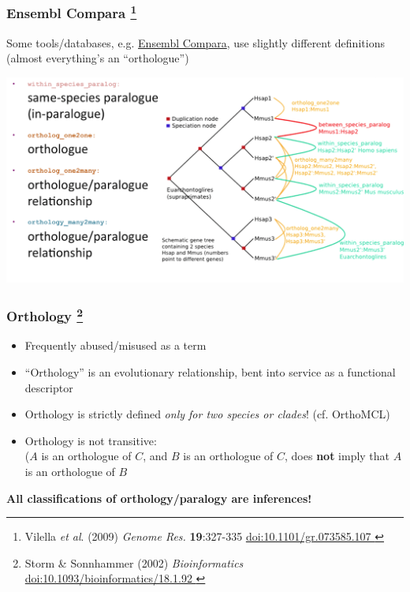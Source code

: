 %
\begin{frame}
  \frametitle{Ensembl Compara
    \footnote{\tiny{Vilella \textit{et al}. (2009) \textit{Genome Res.} \textbf{19}:327-335 \href{http://dx.doi.org/10.1101/gr.073585.107}{doi:10.1101/gr.073585.107
    }}}
    }
  Some tools/databases, e.g. \href{http://www.ensembl.org/info/genome/compara/index.html}{Ensembl Compara}, use slightly different definitions (almost everything's an ``orthologue'')
  \begin{center}
    \includegraphics[width=1\textwidth]{images/logues7}  
  \end{center} 
\end{frame}

% 
\begin{frame}
  \frametitle{Orthology
    \footnote{\tiny{Storm \& Sonnhammer (2002) \textit{Bioinformatics} \href{http://dx.doi.org/10.1093/bioinformatics/18.1.92}{doi:10.1093/bioinformatics/18.1.92
    }}}
    }
  \begin{itemize}
    \item \textcolor{RawSienna}{Frequently abused/misused as a term}
    \item \textcolor{hutton_green}{``Orthology'' is an evolutionary relationship, bent into service as a functional descriptor}
    \item \textcolor{hutton_blue}{Orthology is strictly defined \textit{only for two species or clades}! (cf. OrthoMCL)}
    \item \textcolor{hutton_purple}{Orthology is not transitive: \\ ($A$ is an orthologue of $C$, and $B$ is an orthologue of $C$, does \textbf{not} imply that $A$ is an orthologue of $B$}
  \end{itemize}
  \textbf{All classifications of orthology/paralogy are inferences!}
\end{frame}